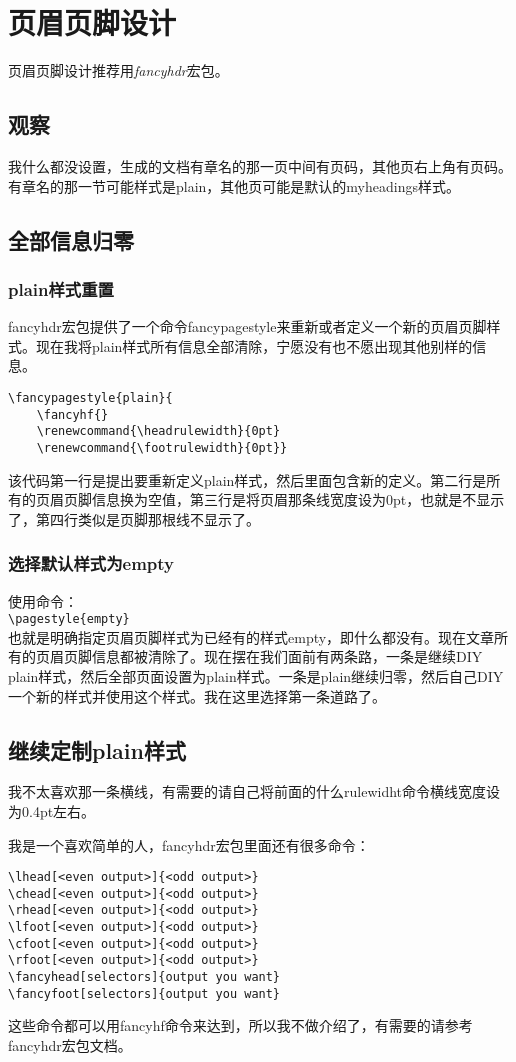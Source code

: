 \section{页眉页脚设计}
页眉页脚设计推荐用\emph{fancyhdr}宏包。
\subsection{观察}
我什么都没设置，生成的文档有章名的那一页中间有页码，其他页右上角有页码。有章名的那一节可能样式是plain，其他页可能是默认的myheadings样式。

\subsection{全部信息归零}
\subsubsection{plain样式重置}
fancyhdr宏包提供了一个命令fancypagestyle来重新或者定义一个新的页眉页脚样式。现在我将plain样式所有信息全部清除，宁愿没有也不愿出现其他别样的信息。
\begin{verbatim}
\fancypagestyle{plain}{
    \fancyhf{}
    \renewcommand{\headrulewidth}{0pt}
    \renewcommand{\footrulewidth}{0pt}}
\end{verbatim}
该代码第一行是提出要重新定义plain样式，然后里面包含新的定义。第二行是所有的页眉页脚信息换为空值，第三行是将页眉那条线宽度设为0pt，也就是不显示了，第四行类似是页脚那根线不显示了。

\subsubsection{选择默认样式为empty}
使用命令：\\
\verb+\pagestyle{empty}+\\
也就是明确指定页眉页脚样式为已经有的样式empty，即什么都没有。现在文章所有的页眉页脚信息都被清除了。现在摆在我们面前有两条路，一条是继续DIY plain样式，然后全部页面设置为plain样式。一条是plain继续归零，然后自己DIY一个新的样式并使用这个样式。我在这里选择第一条道路了。

\subsection{继续定制plain样式}
我不太喜欢那一条横线，有需要的请自己将前面的什么rulewidht命令横线宽度设为0.4pt左右。

我是一个喜欢简单的人，fancyhdr宏包里面还有很多命令：
\begin{verbatim}
\lhead[<even output>]{<odd output>}
\chead[<even output>]{<odd output>}
\rhead[<even output>]{<odd output>}
\lfoot[<even output>]{<odd output>}
\cfoot[<even output>]{<odd output>}
\rfoot[<even output>]{<odd output>}
\fancyhead[selectors]{output you want}
\fancyfoot[selectors]{output you want}
\end{verbatim}
这些命令都可以用fancyhf命令来达到，所以我不做介绍了，有需要的请参考fancyhdr宏包文档。

